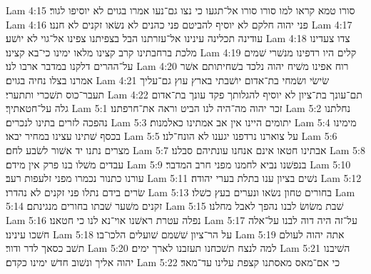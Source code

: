 Lam 4:15  סורו טמא קראו למו סורו סורו אל־תגעו כי נצו גם־נעו אמרו בגוים לא יוסיפו לגור׃
Lam 4:16  פני יהוה חלקם לא יוסיף להביטם פני כהנים לא נשׂאו זקנים לא חננו׃
Lam 4:17  עודינה תכלינה עינינו אל־עזרתנו הבל בצפיתנו צפינו אל־גוי לא יושׁע׃
Lam 4:18  צדו צעדינו מלכת ברחבתינו קרב קצינו מלאו ימינו כי־בא קצינו׃
Lam 4:19  קלים היו רדפינו מנשׁרי שׁמים על־ההרים דלקנו במדבר ארבו לנו׃
Lam 4:20  רוח אפינו משׁיח יהוה נלכד בשׁחיתותם אשׁר אמרנו בצלו נחיה בגוים׃
Lam 4:21  שׂישׂי ושׂמחי בת־אדום יושׁבתי בארץ עוץ גם־עליך תעבר־כוס תשׁכרי ותתערי׃
Lam 4:22  תם־עונך בת־ציון לא יוסיף להגלותך פקד עונך בת־אדום גלה על־חטאתיך׃
Lam 5:1  זכר יהוה מה־היה לנו הביט וראה את־חרפתנו׃
Lam 5:2  נחלתנו נהפכה לזרים בתינו לנכרים׃
Lam 5:3  יתומים היינו אין אב אמתינו כאלמנות׃
Lam 5:4  מימינו בכסף שׁתינו עצינו במחיר יבאו׃
Lam 5:5  על צוארנו נרדפנו יגענו לא הונח־לנו׃
Lam 5:6  מצרים נתנו יד אשׁור לשׂבע לחם׃
Lam 5:7  אבתינו חטאו אינם אנחנו עונתיהם סבלנו׃
Lam 5:8  עבדים משׁלו בנו פרק אין מידם׃
Lam 5:9  בנפשׁנו נביא לחמנו מפני חרב המדבר׃
Lam 5:10  עורנו כתנור נכמרו מפני זלעפות רעב׃
Lam 5:11  נשׁים בציון ענו בתלת בערי יהודה׃
Lam 5:12  שׂרים בידם נתלו פני זקנים לא נהדרו׃
Lam 5:13  בחורים טחון נשׂאו ונערים בעץ כשׁלו׃
Lam 5:14  זקנים משׁער שׁבתו בחורים מנגינתם׃
Lam 5:15  שׁבת משׂושׂ לבנו נהפך לאבל מחלנו׃
Lam 5:16  נפלה עטרת ראשׁנו אוי־נא לנו כי חטאנו׃
Lam 5:17  על־זה היה דוה לבנו על־אלה חשׁכו עינינו׃
Lam 5:18  על הר־ציון שׁשׁמם שׁועלים הלכו־בו׃
Lam 5:19  אתה יהוה לעולם תשׁב כסאך לדר ודור׃
Lam 5:20  למה לנצח תשׁכחנו תעזבנו לארך ימים׃
Lam 5:21  השׁיבנו יהוה אליך ונשׁוב חדשׁ ימינו כקדם׃
Lam 5:22  כי אם־מאס מאסתנו קצפת עלינו עד־מאד׃


